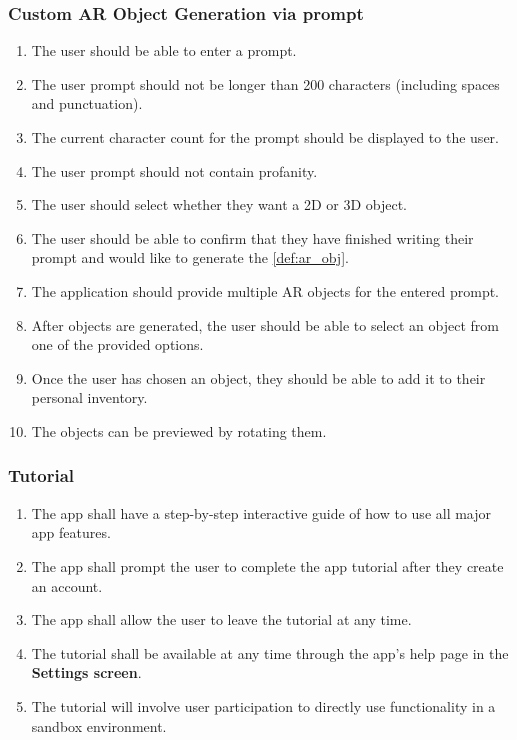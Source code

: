 \documentclass{article}
\begin{document}
\subsubsection{Custom AR Object Generation via prompt}
\label{ssub:prompt_obj_gen}

\begin{enumerate}[align=left, label=\textbf{POG-FR\arabic*:}]
    \item The user should be able to enter a prompt.
    \item The user prompt should not be longer than 200 characters (including spaces and punctuation).
    \item The current character count for the prompt should be displayed to the user.
    \item The user prompt should not contain profanity.
    \item The user should select whether they want a 2D or 3D object.
    \item The user should be able to confirm that they have finished writing their prompt and would like to generate the \ref{def:ar_obj}.
    \item The application should provide multiple AR objects for the entered prompt.
    \item After objects are generated, the user should be able to select an object from one of the provided options.
    \item Once the user has chosen an object, they should be able to add it to their personal inventory.
    \item The objects can be previewed by rotating them.
\end{enumerate}

\subsubsection{Tutorial}
\label{ssub:tutorial}

\begin{enumerate}[align=left, label=\textbf{TU-FR\arabic*:}]
    \item The app shall have a step-by-step interactive guide of how to use all major app features.
    \item The app shall prompt the user to complete the app tutorial after they create an account.
    \item The app shall allow the user to leave the tutorial at any time.
    \item The tutorial shall be available at any time through the app's help page in the \textbf{Settings screen}.
    \item The tutorial will involve user participation to directly use functionality in a sandbox environment.
\end{enumerate}
\end{document}
